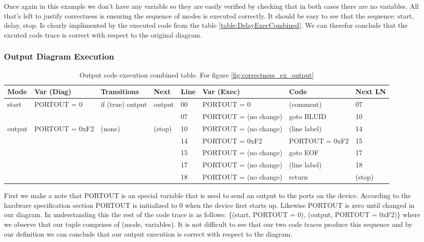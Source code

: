 Once again in this example we don't have any variable so they are easily verified by checking that in both cases
there are no variables. All that's left to justify correctness is ensuring the sequence of modes is executed correctly.
It should be easy to see that the sequence: start, delay, stop. Is clearly implimented by the executed code from the table
\ref{table:DelayExecCombined}. We can therefor conclude that the excuted code trace is correct with respect to the original
diagram.

\subsubsection{Output Diagram Execution}

\begin{table}[htcb]
	\caption{Output code execution combined table. For figure \ref{fig:correctness_ex_output}}
	\centering
	\tablefontsize
		\begin{tabular}{| p{} | p{} | p{} | p{} | p{} | p{} | p{} | p{} |}
			\hline
			\textbf{Mode} 		&	\textbf{Var (Diag)} 		& 	\textbf{Transitions} 		& 	\textbf{Next}		&	\textbf{Line}		&	\textbf{Var (Exec)	}	&	\textbf{Code}	&	\textbf{Next LN} \\
			\hline
			start 				&	PORTOUT = 0					&	if (true) output			&	output				&	00					&	PORTOUT = 0				& 	(comment)		&	07 \\
			\hline
								&								&								&						&	07					&   PORTOUT = (no change)	&	goto BLUID		&	10 \\
			\hline
			output				&	PORTOUT = 0xF2				&	(none)						&	(stop)				&	10					&	PORTOUT = (no change)	&	(line label)	&	14 \\
			\hline
								&								&								&						&	14					&	PORTOUT = 0xF2			&	PORTOUT = 0xF2	&	15 \\
			\hline
								&								&								&						&	15					&	PORTOUT = (no change)	&	goto EOF		&	17 \\
			\hline
								&								&								&						&	17					&	PORTOUT = (no change)	&	(line label)	&	18 \\
			\hline
								&								&								&						&	18					&	PORTOUT = (no change)	&	return			&	(stop) \\
			\hline
		\end{tabular}
	\label{table:OutputExecCombined}
\end{table}

First we make a note that PORTOUT is an special variable that is used to send an output to the ports on the device.
According to the hardware specification section PORTOUT is initialized to 0 when the device first starts up.
Likewise PORTOUT is zero until changed in our diagram. In understanding this the rest of the code trace is as follows:
\{(start, PORTOUT = 0), (output, PORTOUT = 0xF2)\} where we observe that our tuple comprises of (mode, variables). 
It is not difficult to see that our two code traces produce this sequence and by our definition we can conclude that our
output execution is correct with respect to the diagram.


